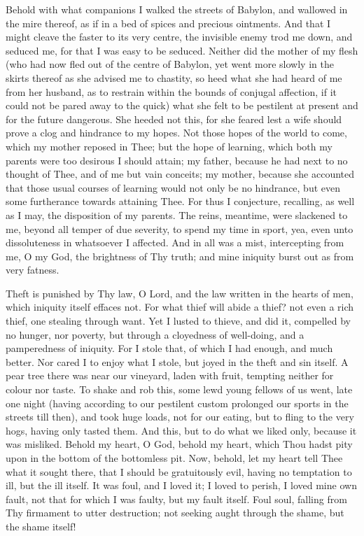 \documentclass[b5paper,openright,12pt,twoside]{book}
\begin{document}
Behold with what companions I walked the streets of Babylon, and
wallowed in the mire thereof, as if in a bed of spices and precious
ointments. And that I might cleave the faster to its very centre, the
invisible enemy trod me down, and seduced me, for that I was easy to be
seduced. Neither did the mother of my flesh (who had now fled out of
the centre of Babylon, yet went more slowly in the skirts thereof as
she advised me to chastity, so heed what she had heard of me from her
husband, as to restrain within the bounds of conjugal affection, if it
could not be pared away to the quick) what she felt to be pestilent
at present and for the future dangerous. She heeded not this, for she
feared lest a wife should prove a clog and hindrance to my hopes. Not
those hopes of the world to come, which my mother reposed in Thee; but
the hope of learning, which both my parents were too desirous I should
attain; my father, because he had next to no thought of Thee, and of
me but vain conceits; my mother, because she accounted that those
usual courses of learning would not only be no hindrance, but even some
furtherance towards attaining Thee. For thus I conjecture, recalling, as
well as I may, the disposition of my parents. The reins, meantime, were
slackened to me, beyond all temper of due severity, to spend my time in
sport, yea, even unto dissoluteness in whatsoever I affected. And in all
was a mist, intercepting from me, O my God, the brightness of Thy truth;
and mine iniquity burst out as from very fatness.

Theft is punished by Thy law, O Lord, and the law written in the hearts
of men, which iniquity itself effaces not. For what thief will abide a
thief? not even a rich thief, one stealing through want. Yet I lusted to
thieve, and did it, compelled by no hunger, nor poverty, but through a
cloyedness of well-doing, and a pamperedness of iniquity. For I stole
that, of which I had enough, and much better. Nor cared I to enjoy what
I stole, but joyed in the theft and sin itself. A pear tree there was
near our vineyard, laden with fruit, tempting neither for colour nor
taste. To shake and rob this, some lewd young fellows of us went, late
one night (having according to our pestilent custom prolonged our sports
in the streets till then), and took huge loads, not for our eating, but
to fling to the very hogs, having only tasted them. And this, but to
do what we liked only, because it was misliked. Behold my heart, O
God, behold my heart, which Thou hadst pity upon in the bottom of the
bottomless pit. Now, behold, let my heart tell Thee what it sought
there, that I should be gratuitously evil, having no temptation to ill,
but the ill itself. It was foul, and I loved it; I loved to perish,
I loved mine own fault, not that for which I was faulty, but my fault
itself. Foul soul, falling from Thy firmament to utter destruction; not
seeking aught through the shame, but the shame itself!
\end{document}
